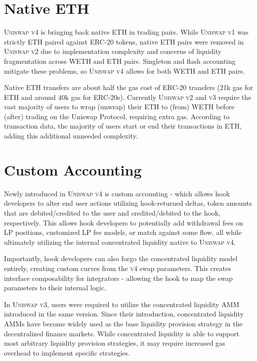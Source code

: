\documentclass[sigconf,nonacm,prologue,table]{acmart}
\numberwithin{equation}{section}
\theoremstyle{definition}
\theoremstyle{remark}
\begin{document}
\section{Native ETH} 
\label{nativeeth}

\textsc{Uniswap v4} is bringing back native ETH in trading pairs. While \textsc{Uniswap v1} was strictly ETH paired against ERC-20 tokens, native ETH pairs were removed in \textsc{Uniswap v2} due to implementation complexity and concerns of liquidity fragmentation across WETH and ETH pairs. Singleton and flash accounting mitigate these problems, so \textsc{Uniswap v4} allows for both WETH and ETH pairs.

Native ETH transfers are about half the gas cost of ERC-20 transfers (21k gas for ETH and around 40k gas for ERC-20s). Currently \textsc{Uniswap v2} and \textsc{v3} require the vast majority of users to wrap (unwrap) their ETH to (from) WETH before (after) trading on the Uniswap Protocol, requiring extra gas. According to transaction data, the majority of users start or end their transactions in ETH, adding this additional unneeded complexity.

\section{Custom Accounting} 
\label{customaccounting}

Newly introduced in \textsc{Uniswap v4} is custom accounting - which allows hook developers to alter end user actions utilizing hook-returned deltas, token amounts that are debited/credited to the user and credited/debited to the hook, respectively. This allows hook developers to potentially add withdrawal fees on LP positions, customized LP fee models, or match against some flow, all while ultimately utilizing the internal concentrated liquidity native to \textsc{Uniswap v4}. 

Importantly, hook developers can also forgo the concentrated liquidity model entirely, creating custom curves from the \textsc{v4} swap parameters. This creates interface composability for integrators - allowing the hook to map the swap parameters to their internal logic.

In \textsc{Uniswap v3}, users were required to utilize the concentrated liquidity AMM introduced in the same version. Since their introduction, concentrated liquidity AMMs have become widely used as the base liquidity provision strategy in the decentralized finance markets. While concentrated liquidity is able to support most arbitrary liquidity provision strategies, it may require increased gas overhead to implement specific strategies.
\end{document}
